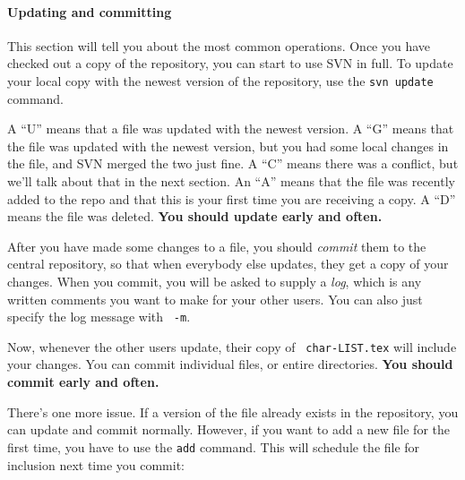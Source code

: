 \documentclass[green]{testgame}
\begin{document}
\paragraph*{Updating and committing}

This section will tell you about the most common operations. Once you
have checked out a copy of the repository, you can start to use SVN in
full. To update your local copy with the newest version of the
repository, use the {\tt svn update} command.


A ``U'' means that a file was updated with the newest version. A ``G''
means that the file was updated with the newest version, but you had
some local changes in the file, and SVN merged the two just fine.  A
``C'' means there was a conflict, but we'll talk about that in the
next section. An ``A'' means that the file was recently added to the
repo and that this is your first time you are receiving a copy. A
``D'' means the file was deleted. {\bf You should update early and
often.}

After you have made some changes to a file, you should {\em commit}
them to the central repository, so that when everybody else updates,
they get a copy of your changes. When you commit, you will be asked to
supply a {\em log}, which is any written comments you want to make for
your other users. You can also just specify the log message with {\tt
-m}.


Now, whenever the other users update, their copy of {\tt
char-LIST.tex} will include your changes. You can commit individual
files, or entire directories. {\bf You should commit early and often.}

There's one more issue. If a version of the file already exists in the
repository, you can update and commit normally. However, if you want
to add a new file for the first time, you have to use the {\tt add}
command. This will schedule the file for inclusion next time you
commit:

\end{document}
